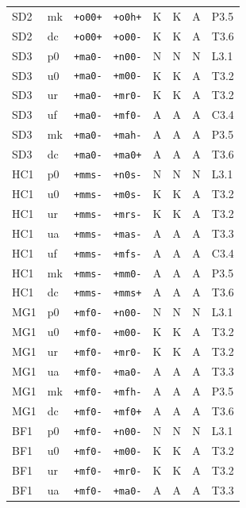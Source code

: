 {\begin{longtable}{@{}llllcccl@{}}
SD2 & mk & \texttt{+o00+} & \texttt{+o0h+} & K & K & A & P3.5 \\
SD2 & dc & \texttt{+o00+} & \texttt{+o00-} & K & K & A & T3.6 \\
SD3 & p0 & \texttt{+ma0-} & \texttt{+n00-} & N & N & N & L3.1 \\
SD3 & u0 & \texttt{+ma0-} & \texttt{+m00-} & K & K & A & T3.2 \\
SD3 & ur & \texttt{+ma0-} & \texttt{+mr0-} & K & K & A & T3.2 \\
SD3 & uf & \texttt{+ma0-} & \texttt{+mf0-} & A & A & A & C3.4 \\
SD3 & mk & \texttt{+ma0-} & \texttt{+mah-} & A & A & A & P3.5 \\
SD3 & dc & \texttt{+ma0-} & \texttt{+ma0+} & A & A & A & T3.6 \\
HC1 & p0 & \texttt{+mms-} & \texttt{+n0s-} & N & N & N & L3.1 \\
HC1 & u0 & \texttt{+mms-} & \texttt{+m0s-} & K & K & A & T3.2 \\
HC1 & ur & \texttt{+mms-} & \texttt{+mrs-} & K & K & A & T3.2 \\
HC1 & ua & \texttt{+mms-} & \texttt{+mas-} & A & A & A & T3.3 \\
HC1 & uf & \texttt{+mms-} & \texttt{+mfs-} & A & A & A & C3.4 \\
HC1 & mk & \texttt{+mms-} & \texttt{+mm0-} & A & A & A & P3.5 \\
HC1 & dc & \texttt{+mms-} & \texttt{+mms+} & A & A & A & T3.6 \\
MG1 & p0 & \texttt{+mf0-} & \texttt{+n00-} & N & N & N & L3.1 \\
MG1 & u0 & \texttt{+mf0-} & \texttt{+m00-} & K & K & A & T3.2 \\
MG1 & ur & \texttt{+mf0-} & \texttt{+mr0-} & K & K & A & T3.2 \\
MG1 & ua & \texttt{+mf0-} & \texttt{+ma0-} & A & A & A & T3.3 \\
MG1 & mk & \texttt{+mf0-} & \texttt{+mfh-} & A & A & A & P3.5 \\
MG1 & dc & \texttt{+mf0-} & \texttt{+mf0+} & A & A & A & T3.6 \\
BF1 & p0 & \texttt{+mf0-} & \texttt{+n00-} & N & N & N & L3.1 \\
BF1 & u0 & \texttt{+mf0-} & \texttt{+m00-} & K & K & A & T3.2 \\
BF1 & ur & \texttt{+mf0-} & \texttt{+mr0-} & K & K & A & T3.2 \\
BF1 & ua & \texttt{+mf0-} & \texttt{+ma0-} & A & A & A & T3.3 \\

\end{longtable}}
